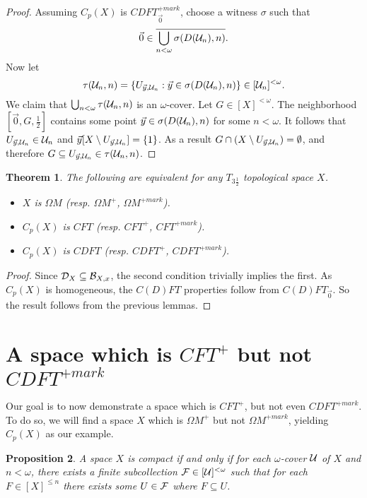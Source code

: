 \documentclass{amsart}
\theoremstyle{plain}
\newtheorem{theorem}{Theorem}
\newtheorem{proposition}[theorem]{Proposition}
\theoremstyle{definition}
\theoremstyle{remark}
\theoremstyle{plain}
\theoremstyle{definition}
\theoremstyle{remark}
\begin{document}
\begin{proof}
  Assuming \(C_p(X)\) is \(CDFT_{\vec 0}^{+mark}\), choose a witness
  \(\sigma\) such that
  \[
    \vec 0
      \in
    \overline{\bigcup_{n<\omega} \sigma(D(\mathcal{U}_n),n)}
  .\]
  Now let
  \[
    \tau(\mathcal{U}_n,n)
      =
    \{
      U_{\vec y,\mathcal{U}_n}
    :
      \vec y \in \sigma(D(\mathcal{U}_n),n)
    \}
      \in
    [\mathcal{U}_n]^{<\omega}
  .\]
  We claim that \(\bigcup_{n<\omega}\tau(\mathcal{U}_n,n)\)
  is an \(\omega\)-cover.
  Let \(G\in[X]^{<\omega}\). The neighborhood \([\vec 0,G,\frac{1}{2}]\)
  contains some point \(\vec y\in \sigma(D(\mathcal{U}_n),n)\)
  for some \(n<\omega\). It follows
  that \(U_{\vec y,\mathcal{U}_n}\in\mathcal{U}_n\) and
  \(\vec y[X\setminus U_{\vec y,\mathcal{U}_n}]=\{1\}\). As a result
  \(G\cap(X\setminus U_{\vec y,\mathcal{U}_n})=\emptyset\), and therefore
  \(G\subseteq U_{\vec y,\mathcal{U}_n}\in\mathcal{\tau}(\mathcal{U}_n,n)\).
\end{proof}

\begin{theorem}
  The following are equivalent for any \(T_{3\frac{1}{2}}\)
  topological space \(X\).
    \begin{itemize}
      \item \(X\) is \(\Omega M\)
            (resp. \(\Omega M^+\), \(\Omega M^{+mark}\)).
      \item \(C_p(X)\) is \(CFT\)
            (resp. \(CFT^+\), \(CFT^{+mark}\)).
      \item \(C_p(X)\) is \(CDFT\)
            (resp. \(CDFT^+\), \(CDFT^{+mark}\)).
    \end{itemize}
\end{theorem}

\begin{proof}
  Since \(\mathcal{D}_X\subseteq \mathcal{B}_{X,x}\), the second condition trivially
  implies the first. As \(C_p(X)\) is homogeneous, the \(C(D)FT\) properties
  follow from \(C(D)FT_{\vec 0}\). So the result follows from the
  previous lemmas.
\end{proof}

\section{A space which is \(CFT^+\) but not \(CDFT^{+mark}\)}

Our goal is to now demonstrate a space which is \(CFT^+\),
but not even \(CDFT^{+mark}\). To do so, we will find a space \(X\)
which is \(\Omega M^+\) but not \(\Omega M^{+mark}\), yielding \(C_p(X)\)
as our example.

\begin{proposition}\label{altCompactCharacterization}
  A space \(X\) is compact if and only if for each \(\omega\)-cover
  \(\mathcal{U}\) of \(X\) and \(n<\omega\), there exists a finite subcollection
  \(\mathcal{F}\in[\mathcal{U}]^{<\omega}\) such that for each \(F\in[X]^{\leq n}\)
  there exists some \(U\in\mathcal{F}\) where \(F\subseteq U\).
\end{proposition}
\end{document}
